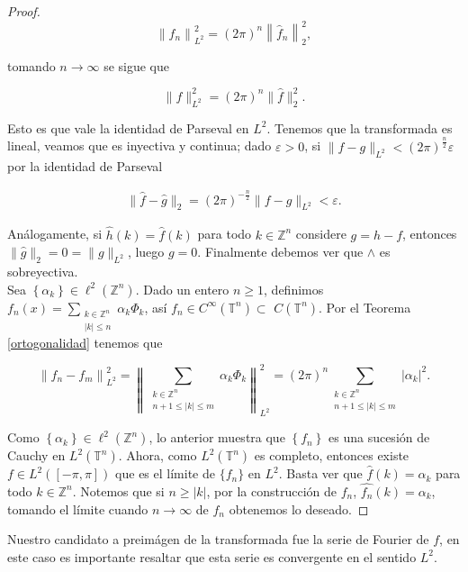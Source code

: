\documentclass[12pt]{article}
\newcommand\Z{\ensuremath{\mathbb{Z}}}
\newcommand\T{\mathbb{T}}
\renewcommand{\epsilon}{\varepsilon}
\renewcommand{\hat}{\widehat}
\begin{document}
\begin{proof}
$$\left\|f_n\right\|_{L^2}^2=(2 \pi)^n\left\|\widehat{f}_n\right\|_2^2,$$

tomando $n\to \infty$ se sigue que

$$\|f\|_{L^2}^2=(2\pi)^n\|\widehat{f}\|_2^2.$$

Esto es que vale la identidad de Parseval en $L^2$. Tenemos que la transformada es lineal, veamos que es inyectiva y continua; dado $\epsilon>0$, si $\|f-g\|_{L^2}<(2\pi)^{\frac{n}{2}}\epsilon$  por la identidad de Parseval

\begin{align*}
    \|\widehat{f}-\widehat{g}\|_2=(2\pi)^{-\frac{n}{2}}\|f-g\|_{L^2}<\epsilon
.\end{align*}

Análogamente, si $\hat{h}(k)=\hat{f}(k)$ para todo $k\in \Z^n$ considere $g=h-f$, entonces $\|\widehat{g}\|_{2}=0=\|g\|_{L^2}$, luego $g=0$. Finalmente debemos ver que $\wedge$ es sobreyectiva.\\

Sea $\left\{\alpha_k\right\} \in \ell^2(\mathbb{Z}^n)$. Dado un entero $n \geq 1$, definimos $f_n(x)=\displaystyle\sum_{\substack{k\in \Z^n\\
|k|\leq n}} \alpha_k \Phi_k$, así $f_n \in C^{\infty}(\T^n) \subset$ $C(\T^n)$. 
Por el Teorema \ref{ortogonalidad} tenemos que

$$
\left\|f_n-f_m\right\|_{L^2}^2=\left\|\sum_{\substack{k\in \Z^n\\
n+1 \leq|k| \leq m}} \alpha_k \Phi_k\right\|_{L^2}^2=(2 \pi)^n\sum_{\substack{k\in \Z^n\\ n+1 \leq|k| \leq m}}\left|\alpha_k\right|^2.
$$


Como $\left\{\alpha_k\right\} \in \ell^2(\mathbb{Z}^n)$, lo anterior muestra que $\left\{f_n\right\}$ es una sucesión de Cauchy en $L^2(\T^n)$. Ahora, como $L^2(\T^n)$ es completo, entonces existe $f \in L^2([-\pi, \pi])$ que es el límite de $\{f_n\}$ en $L^2$. Basta ver que $\widehat{f}(k)=\alpha_k$ para todo $k \in \mathbb{Z}^n$. Notemos que si $n \geq|k|$, por la construcción de $f_n$, $\widehat{f_n}(k)=\alpha_k$, tomando el límite cuando $n\to \infty$ de $f_n$ obtenemos lo deseado.
\end{proof}

\begin{note}
Nuestro candidato a preimágen de la transformada fue la serie de Fourier de $f$, en este caso es importante resaltar que esta serie es convergente  en el sentido $L^2$.
\end{note}
\end{document}

